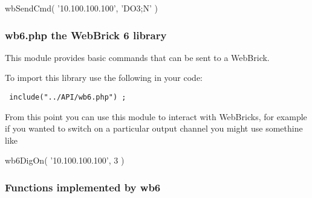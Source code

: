 wbSendCmd( '10.100.100.100', 'DO3;N' )

\subsubsection{wb6.php the WebBrick 6 library}

This module provides basic commands that can be sent to a WebBrick.

To import this library use the following in your code:

\begin{verbatim} include("../API/wb6.php") ;\end{verbatim}

From this point you can use this module to interact with WebBricks, for example
if you wanted to switch on a particular output channel you might use
somethine like

wb6DigOn( '10.100.100.100', 3 )

\subsubsection{Functions implemented by wb6}

